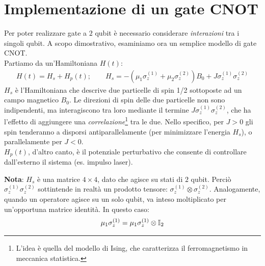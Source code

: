 \documentclass[../../InformazioneQuantistica.tex]{subfiles}
\begin{document}

\section{Implementazione di un gate CNOT}
Per poter realizzare gate a $2$ qubit è necessario considerare \textit{interazioni} tra i singoli qubit. A scopo dimostrativo, esaminiamo ora un semplice modello di gate CNOT.\\
Partiamo da un'Hamiltoniana $H(t)$:
\begin{align*}
    H(t) = H_s + H_p(t); \qquad H_s = -(\mu_1 \sigma_z^{(1)} + \mu_2 \sigma_z^{(2)})B_0 + J \sigma_z^{(1)} \sigma_z^{(2)} 
\end{align*}
$H_s$ è l'Hamiltoniana che descrive due particelle di spin 1/2 sottoposte ad un campo magnetico $B_0$. Le direzioni di spin delle due particelle non sono indipendenti, ma interagiscono tra loro mediante il termine $J\sigma_z^{(1)}\sigma_z^{(2)}$, che ha l'effetto di aggiungere una \textit{correlazione}\footnote{L'idea è quella del modello di Ising, che caratterizza il ferromagnetismo in meccanica statistica.} tra le due. Nello specifico, per $J>0$ gli spin tenderanno a disporsi antiparallelamente (per minimizzare l'energia $H_s$), o parallelamente per $J<0$.\\
$H_p(t)$, d'altro canto, è il potenziale perturbativo che consente di controllare dall'esterno il sistema (es. impulso laser).

\textbf{Nota}: $H_s$ è una matrice $4\times 4$, dato che agisce su stati di $2$ qubit. Perciò $\sigma_z^{(1)}\sigma_z^{(2)}$ sottintende in realtà un prodotto tensore: $\sigma_z^{(1)}\otimes \sigma_z^{(2)}$. Analogamente, quando un operatore agisce su un solo qubit, va inteso moltiplicato per un'opportuna matrice identità. In questo caso:
\begin{align*}
    \mu_1 \sigma_z^{(1)} = \mu_1 \sigma_z^{(1)} \otimes \mathbb{I}_2
\end{align*}
\end{document}
